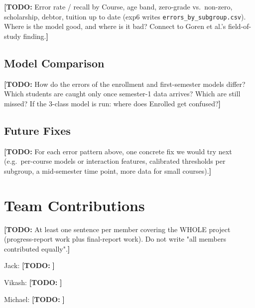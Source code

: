 \documentclass[11pt]{article}
\newcommand{\todo}[1]{{\color{red}\textbf{[TODO:} #1\textbf{]}}}
\newcommand{\todo}[1]{}
\begin{document}
\todo{Error rate / recall by Course, age band, zero-grade vs.\ non-zero, scholarship, debtor, tuition up to date (exp6 writes \texttt{errors\_by\_subgroup.csv}). Where is the model good, and where is it bad? Connect to Goren et al.'s field-of-study finding.}

\subsection{Model Comparison}

\todo{How do the errors of the enrollment and first-semester models differ? Which students are caught only once semester-1 data arrives? Which are still missed? If the 3-class model is run: where does Enrolled get confused?}

\subsection{Future Fixes}

\todo{For each error pattern above, one concrete fix we would try next (e.g.\ per-course models or interaction features, calibrated thresholds per subgroup, a mid-semester time point, more data for small courses).}


\section*{Team Contributions}

\todo{At least one sentence per member covering the WHOLE project (progress-report work plus final-report work). Do not write "all members contributed equally".}

Jack: \todo{}

Vikash: \todo{}

Michael: \todo{}


\end{document}

